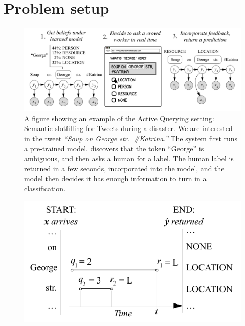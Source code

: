 \section{Problem setup}
\label{sec:model}

\begin{figure}[t]
  \begin{centering}
  \includegraphics[width=1.0\textwidth]{figures/intro-banner.pdf}
  \end{centering}
  \caption{A figure showing an example of the Active Querying setting: Semantic slotfilling for Tweets during a disaster. We are interested in the tweet \textit{``Soup on George str.\ \#Katrina.''} The system first runs a pre-trained model, discovers that the token ``George'' is ambiguous, and then asks a human for a label. The human label is returned in a few seconds, incorporated into the model, and the model then decides it has enough information to turn in a classification.}
\label{fig:crf}
\end{figure}

\begin{figure}[t]
  \begin{centering}
  \includegraphics[width=1.0\textwidth]{figures/piano-roll.pdf}
  \end{centering}
  \caption{}
\label{fig:piano-roll}
\end{figure}


